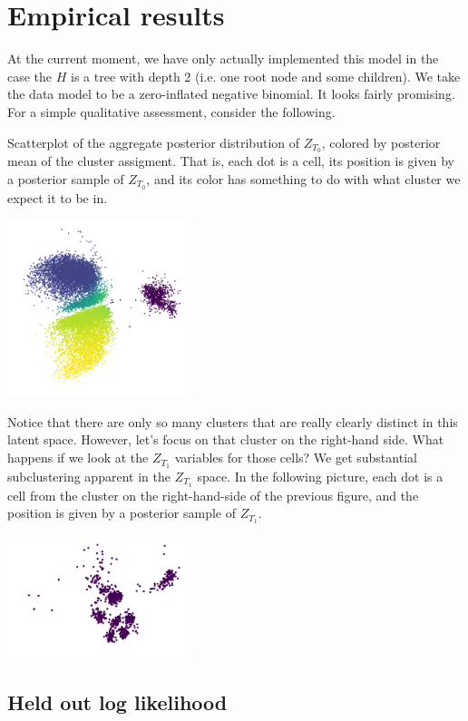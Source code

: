 \section{Empirical results}

At the current moment, we have only actually implemented this model in the case the $H$ is a tree with depth 2 (i.e. one root node and some children).  We take the data model to be a zero-inflated negative binomial.  It looks fairly promising.  For a simple qualitative assessment, consider the following.

Scatterplot of the aggregate posterior distribution of $Z_{T_0}$, colored by posterior mean of the cluster assigment.  That is, each dot is a cell, its position is given by a posterior sample of $Z_{T_0}$, and its color has something to do with what cluster we expect it to be in.  

\includegraphics[width=0.4\textwidth]{pics/Z1}

Notice that there are only so many clusters that are really clearly distinct in this latent space.  However, let's focus on that cluster on the right-hand side.  What happens if we look at the $Z_{T_1}$ variables for those cells?  We get substantial subclustering apparent in the $Z_{T_1}$ space.  In the following picture, each dot is a cell from the cluster on the right-hand-side of the previous figure, and the position is given by a posterior sample of $Z_{T_1}$.

\includegraphics[width=0.4\textwidth]{pics/Z2}


\subsection{Held out log likelihood}


